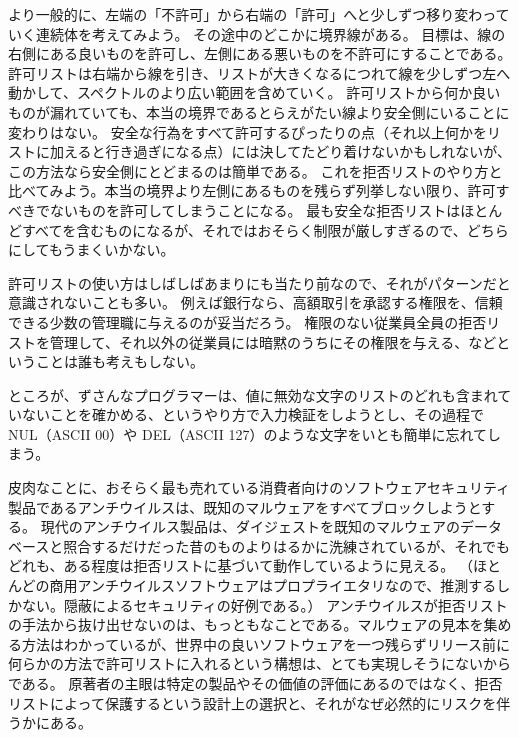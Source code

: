 \documentclass[uplatex]{jsarticle}
\def\label#1{}%
\begin{document}
より一般的に、左端の「不許可」から右端の「許可」へと少しずつ移り変わっていく連続体を考えてみよう。
その途中のどこかに境界線がある。
目標は、線の右側にある良いものを許可し、左側にある悪いものを不許可にすることである。
許可リストは右端から線を引き、リストが大きくなるにつれて線を少しずつ左へ動かして、スペクトルのより広い範囲を含めていく。
許可リストから何か良いものが漏れていても、本当の境界であるとらえがたい線より安全側にいることに変わりはない。
安全な行為をすべて許可するぴったりの点（それ以上何かをリストに加えると行き過ぎになる点）には決してたどり着けないかもしれないが、この方法なら安全側にとどまるのは簡単である。
これを拒否リストのやり方と比べてみよう。本当の境界より左側にあるものを残らず列挙しない限り、許可すべきでないものを許可してしまうことになる。
最も安全な拒否リストはほとんどすべてを含むものになるが、それではおそらく制限が厳しすぎるので、どちらにしてもうまくいかない。

許可リストの使い方はしばしばあまりにも当たり前なので、それがパターンだと意識されないことも多い。
例えば銀行なら、高額取引を承認する権限を、信頼できる少数の管理職に与えるのが妥当だろう。
権限のない従業員全員の拒否リストを管理して、それ以外の従業員には暗黙のうちにその権限を与える、などということは誰も考えもしない。

\begin{rem}[拒否リストによる入力検証]\label{rem:ch4-blocklist-input-validation}
ところが、ずさんなプログラマーは、値に無効な文字のリストのどれも含まれていないことを確かめる、というやり方で入力検証をしようとし、その過程で NUL（ASCII 00）や DEL（ASCII 127）のような文字をいとも簡単に忘れてしまう。
\end{rem}

\begin{exa}[アンチウイルス]\label{exa:ch4-antivirus}
皮肉なことに、おそらく最も売れている消費者向けのソフトウェアセキュリティ製品であるアンチウイルスは、既知のマルウェアをすべてブロックしようとする。
現代のアンチウイルス製品は、ダイジェストを既知のマルウェアのデータベースと照合するだけだった昔のものよりはるかに洗練されているが、それでもどれも、ある程度は拒否リストに基づいて動作しているように見える。
（ほとんどの商用アンチウイルスソフトウェアはプロプライエタリなので、推測するしかない。隠蔽によるセキュリティの好例である。）
アンチウイルスが拒否リストの手法から抜け出せないのは、もっともなことである。マルウェアの見本を集める方法はわかっているが、世界中の良いソフトウェアを一つ残らずリリース前に何らかの方法で許可リストに入れるという構想は、とても実現しそうにないからである。
原著者の主眼は特定の製品やその価値の評価にあるのではなく、拒否リストによって保護するという設計上の選択と、それがなぜ必然的にリスクを伴うかにある。
\end{exa}
\end{document}
